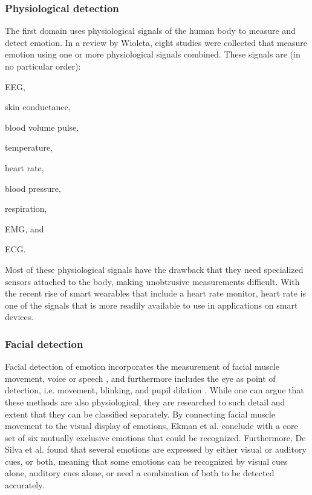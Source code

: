 \documentclass{sigchi}
\begin{document}
\subsubsection{Physiological detection} %
\label{sub:physiology}
The first domain uses physiological signals of the human body to measure and detect emotion. In a review by Wioleta\cite{Wioleta2013}, eight studies were collected that measure emotion using one or more physiological signals combined. These signals are (in no particular order):
\begin{enumerate*}[label=(\alph*)]
  \item EEG,
  \item skin conductance,
  \item blood volume pulse,
  \item temperature,
  \item heart rate,
  \item blood pressure,
  \item respiration,
  \item EMG, and
  \item ECG.
\end{enumerate*}
Most of these physiological signals have the drawback that they need specialized sensors attached to the body, making unobtrusive measurements difficult. With the recent rise of smart wearables that include a heart rate monitor, heart rate is one of the signals that is more readily available to use in applications on smart devices.

\subsubsection{Facial detection} %
\label{sub:facial_detection}
Facial detection of emotion incorporates the measurement of facial muscle movement, voice or speech \cite{Ververidis2004}, and furthermore includes the eye as point of detection, i.e. movement, blinking, and pupil dilation \cite{Soleymani2015}. While one can argue that these methods are also physiological, they are researched to such detail and extent that they can be classified separately. By connecting facial muscle movement to the visual display of emotions, Ekman et al. \cite{Ekman1969} conclude with a core set of six mutually exclusive emotions that could be recognized. Furthermore, De Silva et al. \cite{Silva1997} found that several emotions are expressed by either visual or auditory cues, or both, meaning that some emotions can be recognized by visual cues alone, auditory cues alone, or need a combination of both to be detected accurately.
\end{document}
